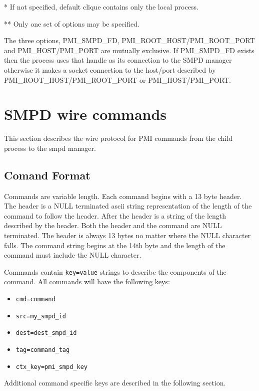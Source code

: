 \documentclass[dvipdfm,11pt]{article}
\begin{document}
* If not specified, default clique contains only the local process.

** Only one set of options may be specified.

The three options, PMI\_SMPD\_FD, PMI\_ROOT\_HOST/PMI\_ROOT\_PORT and PMI\_HOST/PMI\_PORT
are mutually exclusive.  If PMI\_SMPD\_FD exists then the process uses that handle
as its connection to the SMPD manager otherwise it makes a socket connection to
the host/port described by PMI\_ROOT\_HOST/PMI\_ROOT\_PORT or PMI\_HOST/PMI\_PORT.

\section{SMPD wire commands}
This section describes the wire protocol for PMI commands from the child
process to the smpd manager.

\subsection{Comand Format}
Commands are variable length.
Each command begins with a 13 byte header.  The header 
is a NULL terminated ascii string representation of the length of the 
command to follow the header.  After the header is a string of the length 
described by the header.  Both the header and the command are NULL terminated.
The header is always 13 bytes no matter where the NULL character falls.  The
command string begins at the 14th byte and the length of the command must 
include the NULL character.

Commands contain \texttt{key=value} strings to describe the components of 
the command.  All commands will have the following keys:

\begin{itemize}
\item \texttt{cmd=command}
\item \texttt{src=my\_smpd\_id}
\item \texttt{dest=dest\_smpd\_id}
\item \texttt{tag=command\_tag}
\item \texttt{ctx\_key=pmi\_smpd\_key}
\end{itemize}

Additional command specific keys are described in the following section.
\end{document}
